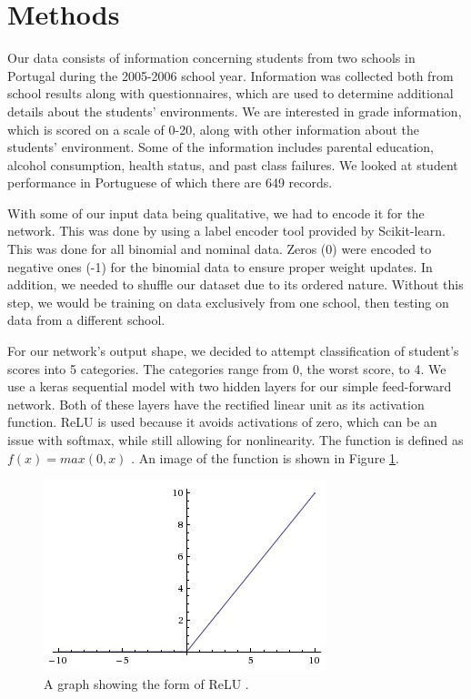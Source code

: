 \documentclass[conference]{IEEEtran}
\begin{document}
\section{Methods}

Our data consists of information concerning students from two schools in Portugal during the 2005-2006 school year. Information was collected both from school results along with questionnaires, which are used to determine additional details about the students’ environments. We are interested in grade information, which is scored on a scale of 0-20, along with other information about the students’ environment. Some of the information includes parental education, alcohol consumption, health status, and past class failures. We looked at student performance in Portuguese of which there are 649 records. 

With some of our input data being qualitative, we had to encode it for the network. This was done by using a label encoder tool provided by Scikit-learn. This was done for all binomial and nominal data. Zeros (0) were encoded to negative ones (-1) for the binomial data to ensure proper weight updates. In addition, we needed to shuffle our dataset due to its ordered nature. Without this step, we would be training on data exclusively from one school, then testing on data from a different school. 

For our network’s output shape, we decided to attempt classification of student’s scores into 5 categories. The categories range from 0, the worst score, to 4. We use a keras sequential model with two hidden layers for our simple feed-forward network. Both of these layers have the rectified linear unit as its activation function. ReLU is used because it avoids activations of zero, which can be an issue with softmax, while still allowing for nonlinearity. The function is defined as $f(x) = max(0,x)$ \cite{kaggle}. An image of the function is shown in Figure \ref{relu}.

\begin{figure}[htbp]
\centerline{\includegraphics[width=\linewidth]{relu.jpg}}
\caption{A graph showing the form of ReLU \cite{kaggle}.}
\label{relu}
\end{figure}
\end{document}
